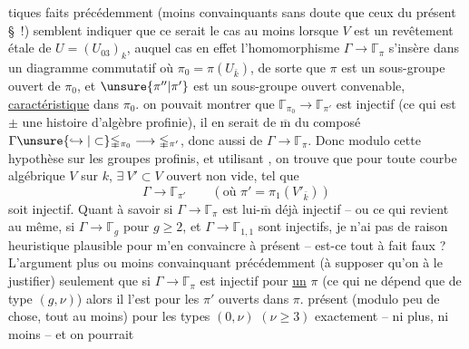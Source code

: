 tiques faits précédemment (moins convainquants sans doute que ceux du présent
\S~!) semblent indiquer que ce serait
le cas au moins lorsque $V$ est un
revêtement étale de $U=(U_{03})_k$, auquel
cas en effet l'homomorphisme $\Gamma\longrightarrow\mathbb{\Gamma}_{\pi}$
s'insère dans un diagramme commutatif
où $\pi_0=\pi(U_{\bar k})$, de sorte que $\pi$ est un sous-groupe ouvert de
$\pi_0$, et $\unsure{\pi''|\pi'}$ est un
sous-groupe ouvert convenable, \uline{caractéristique}
dans $\pi_0$. \uline{} on pouvait montrer que
$\mathbb{\Gamma}_{\pi_0}\longrightarrow\mathbb{\Gamma}_{\pi'}$ est injectif
(ce qui est $\pm$ une histoire d'algèbre profinie), il en serait
de $\overline{\mathrm m}$ du composé
$\Gamma\unsure{\hookrightarrow|\subset}\mathbb{\Gamma}_{\pi_0}
\longrightarrow\mathbb{\Gamma}_{\pi'}$,
donc aussi de $\Gamma\longrightarrow\mathbb{\Gamma}_{\pi}$.
Donc modulo cette hypothèse sur les groupes profinis,
et utilisant , on trouve que
pour toute courbe algébrique $V$ sur $k$,
$\exists\ V'\subset V$ ouvert non vide, tel que
\[
\Gamma\longrightarrow\mathbb{\Gamma}_{\pi'}
\qquad (\text{où }\pi'=\pi_1(V'_{\bar{k}}))
\]
soit injectif. Quant à savoir si
$\Gamma\longrightarrow\mathbb{\Gamma}_{\pi}$ est lui-$\overline{\mathrm m}$ déjà injectif
-- ou  ce qui revient au même, si
$\Gamma\longrightarrow\mathbb{\Gamma}_g$ pour $g\geq 2$, et
$\Gamma\longrightarrow\mathbb{\Gamma}_{1,1}$ sont injectifs,
je n'ai pas de raison heuristique plausible pour m'en convaincre à présent
--  est-ce tout à fait faux ? L'argument
plus ou moins convainquant  précédemment (à supposer qu'on
 à le justifier)  seulement que si
$\Gamma\longrightarrow\mathbb{\Gamma}_{\pi}$ est injectif pour
\uline{un} $\pi$ (ce qui ne dépend que de  type $(g,\nu)$)
alors il l'est pour les $\pi'$ ouverts dans $\pi$.
 
présent (modulo peu de chose, tout au moins)
pour les types $(0,\nu)$ $(\nu\geq 3)$ exactement
-- ni plus, ni moins -- et on pourrait
